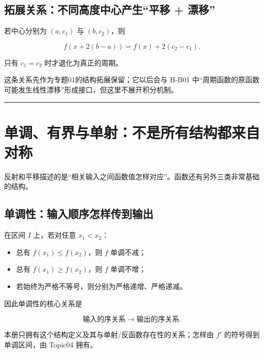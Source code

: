 \documentclass[11pt,a4paper]{ctexart}
\providecommand{\tightlist}{}
\begin{document}
\subsection{拓展关系：不同高度中心产生``平移 + 漂移''}\label{extensionux4e0dux540cux9ad8ux5ea6ux4e2dux5fc3ux4ea7ux751fux5e73ux79fb-ux6f02ux79fb}

若中心分别为 \((a,c_1)\) 与 \((b,c_2)\)，则

\[
\boxed{f(x+2(b-a))=f(x)+2(c_2-c_1)}.
\]

只有 \(c_1=c_2\) 时才退化为真正的周期。

这条关系先作为专题01的结构拓展保留；它以后会与 H-B01
中``周期函数的原函数可能发生线性漂移''形成接口，但这里不展开积分机制。

\begin{center}\rule{0.5\linewidth}{0.5pt}\end{center}

\section{单调、有界与单射：不是所有结构都来自对称}\label{ux5355ux8c03ux6709ux754cux4e0eux5355ux5c04ux4e0dux662fux6240ux6709ux7ed3ux6784ux90fdux6765ux81eaux5bf9ux79f0}

反射和平移描述的是``相关输入之间函数值怎样对应''。函数还有另外三类非常基础的结构。

\subsection{单调性：输入顺序怎样传到输出}\label{ux5355ux8c03ux6027ux8f93ux5165ux987aux5e8fux600eux6837ux4f20ux5230ux8f93ux51fa}

在区间 \(I\) 上，若对任意 \(x_1<x_2\)：

\begin{itemize}
\tightlist
\item
  总有 \(f(x_1)\le f(x_2)\)，则 \(f\) 单调不减；
\item
  总有 \(f(x_1)\ge f(x_2)\)，则 \(f\) 单调不增；
\item
  若始终为严格不等号，则分别为严格递增、严格递减。
\end{itemize}

因此单调性的核心关系是

\[
\boxed{\text{输入的序关系}\longrightarrow\text{输出的序关系}.}
\]

本册只拥有这个结构定义及其与单射/反函数存在性的关系；怎样由 \(f'\)
的符号得到单调区间，由 Topic04 拥有。
\end{document}
